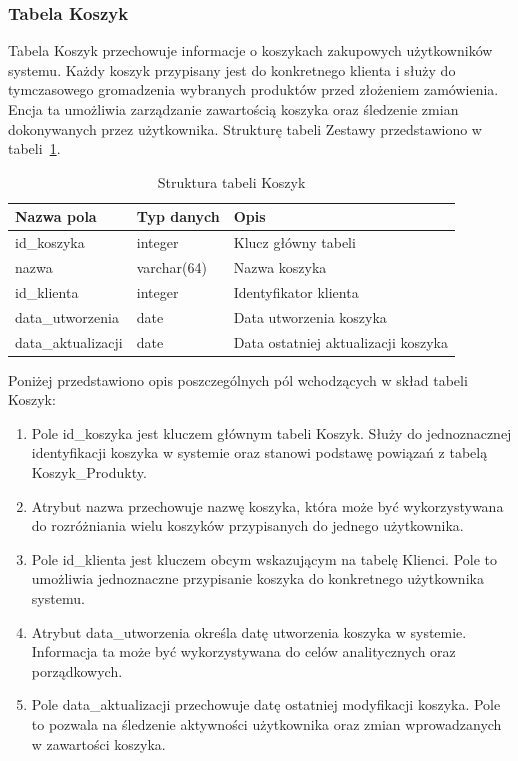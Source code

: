 \documentclass[a4paper,twoside,12pt]{book}
\begin{document}
\subsubsection{Tabela Koszyk}

Tabela Koszyk przechowuje informacje o koszykach zakupowych użytkowników systemu.
Każdy koszyk przypisany jest do konkretnego klienta i służy do tymczasowego
gromadzenia wybranych produktów przed złożeniem zamówienia. Encja ta umożliwia
zarządzanie zawartością koszyka oraz śledzenie zmian dokonywanych przez użytkownika. Strukturę tabeli Zestawy przedstawiono w tabeli~\ref{tab:koszyk}.

\begin{table}[H]
\centering
\caption{Struktura tabeli Koszyk}
\label{tab:koszyk}
\begin{tabular}{lll}
\hline
Nazwa pola & Typ danych & Opis \\ \hline
id\_koszyka & integer & Klucz główny tabeli \\
nazwa & varchar(64) & Nazwa koszyka \\
id\_klienta & integer & Identyfikator klienta \\
data\_utworzenia & date & Data utworzenia koszyka \\
data\_aktualizacji & date & Data ostatniej aktualizacji koszyka \\ \hline
\end{tabular}
\end{table}

Poniżej przedstawiono opis poszczególnych pól wchodzących w skład tabeli Koszyk:

\begin{enumerate}
    \item Pole id\_koszyka jest kluczem głównym tabeli Koszyk. Służy do
    jednoznacznej identyfikacji koszyka w systemie oraz stanowi podstawę
    powiązań z tabelą Koszyk\_Produkty.

    \item Atrybut nazwa przechowuje nazwę koszyka, która może być wykorzystywana
    do rozróżniania wielu koszyków przypisanych do jednego użytkownika.

    \item Pole id\_klienta jest kluczem obcym wskazującym na tabelę Klienci.
    Pole to umożliwia jednoznaczne przypisanie koszyka do konkretnego
    użytkownika systemu.

    \item Atrybut data\_utworzenia określa datę utworzenia koszyka w systemie.
    Informacja ta może być wykorzystywana do celów analitycznych oraz
    porządkowych.

    \item Pole data\_aktualizacji przechowuje datę ostatniej modyfikacji
    koszyka. Pole to pozwala na śledzenie aktywności użytkownika oraz zmian
    wprowadzanych w zawartości koszyka.
\end{enumerate}
\end{document}
